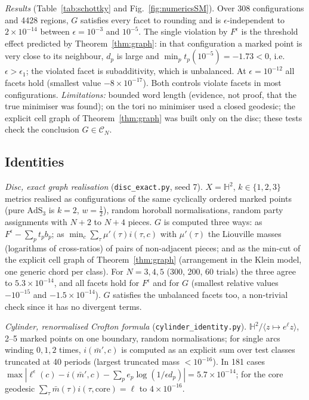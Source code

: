 \documentclass[aps,prd,onecolumn,superscriptaddress,nofootinbib,amsmath,amssymb,11pt]{revtex4-2}
\theoremstyle{definition}
\newcommand{\AdS}{\mathrm{AdS}_3}
\newcommand{\Hyp}{\mathbb{H}^2}
\newcommand{\CN}{\mathcal{C}_N}
\newcommand{\eps}{\epsilon}
\newcommand{\mbar}{\bar m}
\begin{document}
\emph{Results} (Table~\ref{tab:schottky} and Fig.~\ref{fig:numericsSM}). Over 308 configurations and 4428 regions, $G$ satisfies every facet
to rounding and is $\eps$-independent to $2\times10^{-14}$ between $\eps=10^{-3}$ and $10^{-5}$. The single violation by $F^\eps$ is the
threshold effect predicted by Theorem~\ref{thm:graph}: in that configuration a marked point is very close to its neighbour, $d_p$ is
large and $\min_pt_p(10^{-5})=-1.73<0$, i.e.\ $\eps>\eps_1$; the violated facet is subadditivity, which is unbalanced. At
$\eps=10^{-12}$ all facets hold (smallest value $-8\times10^{-17}$). Both controls violate facets in most configurations.
\emph{Limitations:} bounded word length (evidence, not proof, that the true minimiser was found); on the tori no minimiser used a
closed geodesic; the explicit cell graph of Theorem~\ref{thm:graph} was built only on the disc; these tests check the conclusion
$G\in\CN$.

\subsection{Identities}

\emph{Disc, exact graph realisation} (\texttt{disc\_exact.py}, seed 7). $X=\Hyp$, $k\in\{1,2,3\}$ metrics realised as configurations of
the same cyclically ordered marked points (pure $\AdS$ is $k=2$, $w=\frac12$), random horoball normalisations, random party
assignments with $N+2$ to $N+4$ pieces. $G$ is computed three ways: as $F^\eps-\sum_pt_pb_p$; as $\min_c\sum_\tau\mu'(\tau)i(\tau,c)$ with
$\mu'(\tau)$ the Liouville masses (logarithms of cross-ratios) of pairs of non-adjacent pieces; and as the min-cut of the explicit cell
graph of Theorem~\ref{thm:graph} (arrangement in the Klein model, one generic chord per class). For $N=3,4,5$ (300, 200, 60 trials)
the three agree to $5.3\times10^{-14}$, and all facets hold for $F^\eps$ and for $G$ (smallest relative values $-10^{-15}$ and
$-1.5\times10^{-14}$). $G$ satisfies the unbalanced facets too, a non-trivial check since it has no divergent terms.

\emph{Cylinder, renormalised Crofton formula} (\texttt{cylinder\_identity.py}). $\Hyp/\langle z\mapsto e^\ell z\rangle$, 2--5 marked points on
one boundary, random normalisations; for single arcs winding $0,1,2$ times, $i(\mbar',c)$ is computed as an explicit sum over test
classes truncated at 40 periods (largest truncated mass $<10^{-16}$). In 181 cases
$\max|\ell^\eps(c)-i(\mbar',c)-\sum_pe_p\log(1/\eps d_p)|=5.7\times10^{-14}$; for the core geodesic
$\sum_\tau\mbar(\tau)i(\tau,\mathrm{core})=\ell$ to $4\times10^{-16}$.
\end{document}
